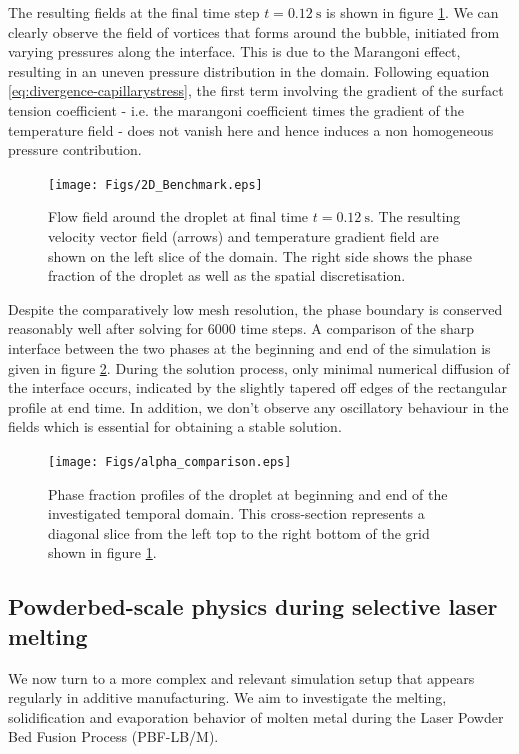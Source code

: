 \documentclass[conference,final]{IEEEtran}
\begin{document}
The resulting fields at the final time step $t = \SI{0.12}{\second}$ is shown in figure \ref{fig:2d-benchmark}. We can clearly observe the field of vortices that forms around the bubble, initiated from varying pressures along the interface. This is due to the Marangoni effect, resulting in an uneven pressure distribution in the domain. Following equation \ref{eq:divergence-capillarystress}, the first term involving the gradient of the surfact tension coefficient - i.e. the marangoni coefficient times the gradient of the temperature field - does not vanish here and hence induces a non homogeneous pressure contribution.

\begin{figure}[!tbp]
  \centering
  \texttt{[image: Figs/2D\_Benchmark.eps]}
  \caption{Flow field around the droplet at final time $t = \SI{0.12}{\second}$. The resulting velocity vector field (arrows) and temperature gradient field are shown on the left slice of the domain. The right side shows the phase fraction of the droplet as well as the spatial discretisation.}
  \label{fig:2d-benchmark}
\end{figure}

Despite the comparatively low mesh resolution, the phase boundary is conserved reasonably well after solving for 6000 time steps. A comparison of the sharp interface between the two phases at the beginning and end of the simulation is given in figure \ref{fig:alpha-comparison}. During the solution process, only minimal numerical diffusion of the interface occurs, indicated by the slightly tapered off edges of the rectangular profile at end time. In addition, we don't observe any oscillatory behaviour in the fields which is essential for obtaining a stable solution.

\begin{figure}[!tbp]
  \centering
  \texttt{[image: Figs/alpha\_comparison.eps]}
  \caption{Phase fraction profiles of the droplet at beginning and end of the investigated temporal domain. This cross-section represents a diagonal slice from the left top to the right bottom of the grid shown in figure \ref{fig:2d-benchmark}.}
  \label{fig:alpha-comparison}
\end{figure}

\subsection{Powderbed-scale physics during selective laser melting}\label{sec:lpbf}

We now turn to a more complex and relevant simulation setup that appears regularly in additive manufacturing. We aim to investigate the melting, solidification and evaporation behavior of molten metal during the Laser Powder Bed Fusion Process (PBF-LB/M).
\end{document}
